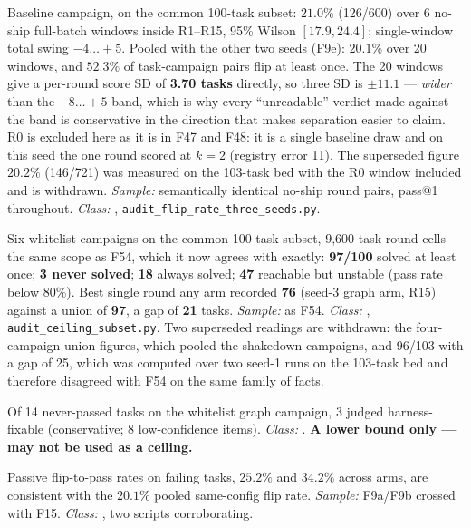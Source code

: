 \begin{description}[leftmargin=0pt,style=nextline,font=\normalfont,itemsep=6pt]
\item[\textbf{F15}\quad Same-config re-draw flip rate.]
Baseline campaign, on the common 100-task subset: \textbf{$21.0\%$}
(126/600) over 6 no-ship full-batch windows inside R1--R15, 95\% Wilson
$[17.9, 24.4]$; single-window total swing $-4\ldots{+}5$. Pooled with the
other two seeds (F9e): $20.1\%$ over 20 windows, and $52.3\%$ of
task-campaign pairs flip at least once. The 20 windows give a per-round
score SD of \textbf{3.70 tasks} directly, so three SD is $\pm 11.1$ ---
\emph{wider} than the $-8\ldots{+}5$ band, which is why every
``unreadable'' verdict made against the band is conservative in the
direction that makes separation easier to claim. R0 is excluded here as
it is in F47 and F48: it is a single baseline draw and on this seed the
one round scored at $k{=}2$ (registry error 11). The superseded figure
$20.2\%$ (146/721) was measured on the 103-task bed with the R0 window
included and is withdrawn. \emph{Sample:} semantically identical no-ship
round pairs, pass@1 throughout. \emph{Class:} ,
\texttt{audit\_flip\_rate\_three\_seeds.py}.

\item[\textbf{F16}\quad Reachability and reliability ceilings.]
Six whitelist campaigns on the common 100-task subset, 9{,}600 task-round
cells --- the same scope as F54, which it now agrees with exactly:
\textbf{97/100} solved at least once; \textbf{3 never solved};
\textbf{18} always solved; \textbf{47} reachable but unstable (pass rate
below $80\%$). Best single round any arm recorded \textbf{76}
(seed-3 graph arm, R15) against a union of \textbf{97}, a gap of
\textbf{21} tasks. \emph{Sample:} as F54. \emph{Class:} ,
\texttt{audit\_ceiling\_subset.py}. Two superseded readings are withdrawn:
the four-campaign union figures, which pooled the shakedown campaigns, and
96/103 with a gap of 25, which was computed over two seed-1 runs on the
103-task bed and therefore disagreed with F54 on the same family of
facts.

\item[\textbf{F17}\quad Reading of the never-passed queue.]
Of 14 never-passed tasks on the whitelist graph campaign, 3 judged
harness-fixable (conservative; 8 low-confidence items).
\emph{Class:} . \textbf{A lower bound only --- may not be used as a
ceiling.}

\item[\textbf{F18}\quad Base-rate consistency check.]
Passive flip-to-pass rates on failing tasks, $25.2\%$ and $34.2\%$ across
arms, are consistent with the $20.1\%$ pooled same-config flip rate.
\emph{Sample:} F9a/F9b crossed with F15. \emph{Class:} , two
scripts corroborating.


\end{description}
